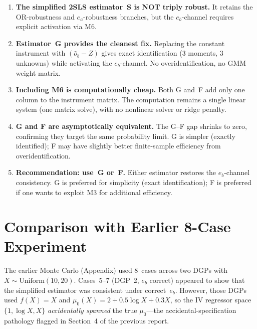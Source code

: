 \documentclass[11pt,letterpaper]{article}
\begin{document}
\begin{enumerate}[nosep]
  \item \textbf{The simplified 2SLS estimator~S is NOT triply robust.}
    It retains the OR-robustness and $e_a$-robustness branches, but the
    $e_b$-channel requires explicit activation via M6.

  \item \textbf{Estimator~G provides the cleanest fix.}
    Replacing the constant instrument with $(\hat{o}_b - Z)$ gives
    exact identification (3 moments, 3 unknowns) while activating the
    $e_b$-channel.  No overidentification, no GMM weight matrix.

  \item \textbf{Including M6 is computationally cheap.}
    Both G and~F add only one column to the instrument matrix.
    The computation remains a single linear system (one matrix solve),
    with no nonlinear solver or ridge penalty.

  \item \textbf{G and F are asymptotically equivalent.}
    The G--F gap shrinks to zero, confirming they target the same
    probability limit.  G is simpler (exactly identified);
    F may have slightly better finite-sample efficiency from
    overidentification.

  \item \textbf{Recommendation: use~G or~F.}
    Either estimator restores the $e_b$-channel consistency.
    G is preferred for simplicity (exact identification);
    F is preferred if one wants to exploit M3 for additional efficiency.
\end{enumerate}


\section{Comparison with Earlier 8-Case Experiment}

The earlier Monte Carlo (Appendix) used 8~cases across two DGPs
with $X \sim \mathrm{Uniform}(10,20)$.  Cases~5--7 (DGP~2, $e_b$
correct) appeared to show that the simplified estimator was
consistent under correct~$e_b$.  However, those DGPs used
$f(X) = X$ and $\mu_0(X) = 2 + 0.5\log X + 0.3 X$, so the
IV regressor space $\{1, \log X, X\}$ \emph{accidentally spanned}
the true $\mu_0$---the accidental-specification pathology flagged
in Section~4 of the previous report.
\end{document}
